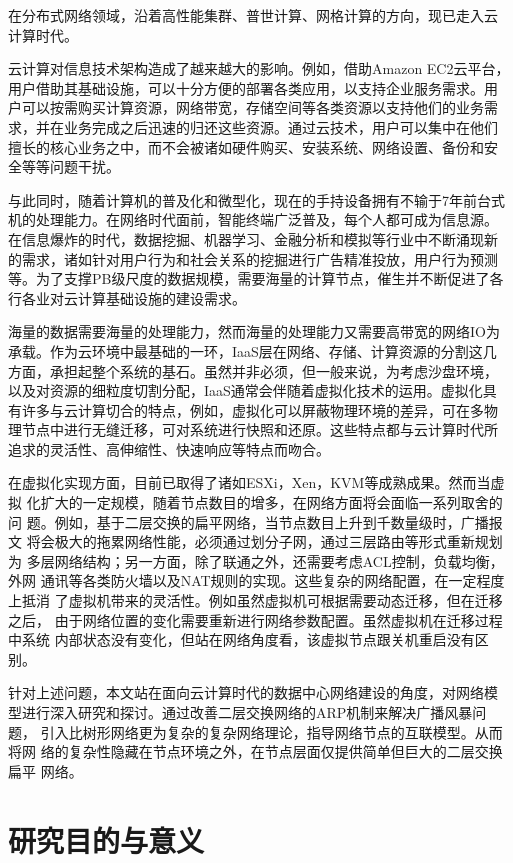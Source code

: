 \documentclass[master,winfonts]{jnuthesis}
\begin{document}
在分布式网络领域，沿着高性能集群、普世计算、网格计算的方向，现已走入云
计算时代。

云计算对信息技术架构造成了越来越大的影响。例如，借助Amazon EC2云平台，
用户借助其基础设施，可以十分方便的部署各类应用，以支持企业服务需求。用
户可以按需购买计算资源，网络带宽，存储空间等各类资源以支持他们的业务需
求，并在业务完成之后迅速的归还这些资源。通过云技术，用户可以集中在他们
擅长的核心业务之中，而不会被诸如硬件购买、安装系统、网络设置、备份和安
全等等问题干扰。

与此同时，随着计算机的普及化和微型化，现在的手持设备拥有不输于7年前台式
机的处理能力。在网络时代面前，智能终端广泛普及，每个人都可成为信息源。
在信息爆炸的时代，数据挖掘、机器学习、金融分析和模拟等行业中不断涌现新
的需求，诸如针对用户行为和社会关系的挖掘进行广告精准投放，用户行为预测
等。为了支撑PB级尺度的数据规模，需要海量的计算节点，催生并不断促进了各
行各业对云计算基础设施的建设需求。

海量的数据需要海量的处理能力，然而海量的处理能力又需要高带宽的网络IO为
承载。作为云环境中最基础的一环，IaaS层在网络、存储、计算资源的分割这几
方面，承担起整个系统的基石。虽然并非必须，但一般来说，为考虑沙盘环境，
以及对资源的细粒度切割分配，IaaS通常会伴随着虚拟化技术的运用。虚拟化具
有许多与云计算切合的特点，例如，虚拟化可以屏蔽物理环境的差异，可在多物
理节点中进行无缝迁移，可对系统进行快照和还原。这些特点都与云计算时代所
追求的灵活性、高伸缩性、快速响应等特点而吻合。

在虚拟化实现方面，目前已取得了诸如ESXi，Xen，KVM等成熟成果。然而当虚拟
化扩大的一定规模，随着节点数目的增多，在网络方面将会面临一系列取舍的问
题。例如，基于二层交换的扁平网络，当节点数目上升到千数量级时，广播报文
将会极大的拖累网络性能，必须通过划分子网，通过三层路由等形式重新规划为
多层网络结构；另一方面，除了联通之外，还需要考虑ACL控制，负载均衡，外网
通讯等各类防火墙以及NAT规则的实现。这些复杂的网络配置，在一定程度上抵消
了虚拟机带来的灵活性。例如虽然虚拟机可根据需要动态迁移，但在迁移之后，
由于网络位置的变化需要重新进行网络参数配置。虽然虚拟机在迁移过程中系统
内部状态没有变化，但站在网络角度看，该虚拟节点跟关机重启没有区别。

针对上述问题，本文站在面向云计算时代的数据中心网络建设的角度，对网络模
型进行深入研究和探讨。通过改善二层交换网络的ARP机制来解决广播风暴问题，
引入比树形网络更为复杂的复杂网络理论，指导网络节点的互联模型。从而将网
络的复杂性隐藏在节点环境之外，在节点层面仅提供简单但巨大的二层交换扁平
网络。

\section{研究目的与意义}
\end{document}

